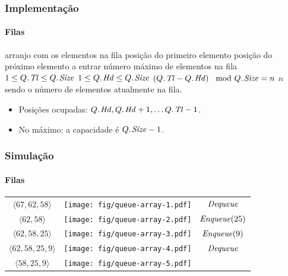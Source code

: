 \documentclass{beamer}
\begin{document}
\begin{frame}

  \frametitle{Implementação}
  \framesubtitle{Filas}

  \begin{codebox}
    \zi {} \> \> \> \Comment arranjo com os elementos na fila
    \zi {}   \> \> \> \Comment posição do primeiro elemento
    \zi {}   \> \> \> \Comment posição do próximo elemento a entrar
    \zi {} \> \> \> \Comment número máximo de elementos na fila
    \zi $1 \le \attrib{Q}{Tl} \le \attrib{Q}{Size}$
    \zi $1 \le \attrib{Q}{Hd} \le \attrib{Q}{Size}$
    \zi $\left( \attrib{Q}{Tl} - \attrib{Q}{Hd} \right) \mod \attrib{Q}{Size} = n$
    \zi \Comment $n$ sendo o número de elementos atualmente na fila.
  \end{codebox}
  \begin{itemize}
  \item Posições ocupadas: $\attrib{Q}{Hd}, \attrib{Q}{Hd}+1, \ldots
  \attrib{Q}{Tl}-1$.
  \item No máximo: a capacidade é $\attrib{Q}{Size} - 1$.
  \end{itemize}
  
\end{frame}

\begin{frame}
  \frametitle{Simulação}
  \framesubtitle{Filas}

  \begin{center}
    \begin{tabular}{ccc}
      $\langle 67, 62, 58 \rangle$ &
      \texttt{[image: fig/queue-array-1.pdf]}
      \pause
      &
      $\id{Dequeue}$ \pause
      \\
      $\langle 62, 58 \rangle$ &
      \texttt{[image: fig/queue-array-2.pdf]}
      \pause
      &
      $\id{Enqueue}(25)$ \pause
      \\
      $\langle 62, 58, 25 \rangle$ &
      \texttt{[image: fig/queue-array-3.pdf]}
      \pause
      &
      $\id{Enqueue}(9)$ \pause
      \\
      $\langle 62, 58, 25, 9 \rangle$ &
      \texttt{[image: fig/queue-array-4.pdf]}
      &
      $\id{Dequeue}$ \pause
      \\
      $\langle 58, 25, 9 \rangle$ &
      \texttt{[image: fig/queue-array-5.pdf]}
      &
    \end{tabular}
  \end{center}

\end{frame}
\end{document}

